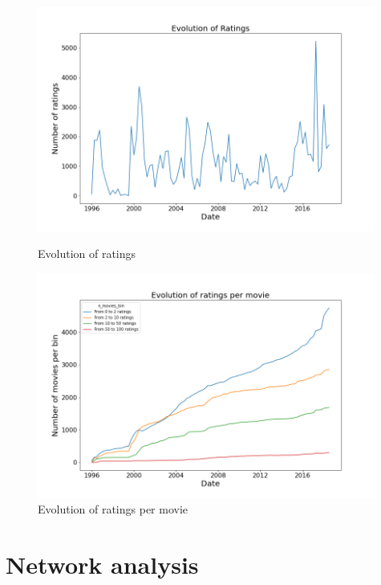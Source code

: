 \documentclass[12pt]{article}
\numberwithin{equation}{section}
\begin{document}
\begin{figure}[h!]
    \begin{minipage}[b]{0.49\linewidth}
        \centering
  	\includegraphics[width=0.99\textwidth]{ratings_evolution.png}
  	\caption{Evolution of ratings}
  	\label{fig:ranking_ts}
    \end{minipage}
    \hspace{0.01cm}
     \begin{minipage}[b]{0.49\linewidth}
         \centering
  	\includegraphics[width=0.99\textwidth]{ratings_evolution_2.png}
  	\caption{Evolution of ratings per movie}
  	\label{fig:evolution_2}
    \end{minipage}
\end{figure}

\section{Network analysis}
\end{document}
